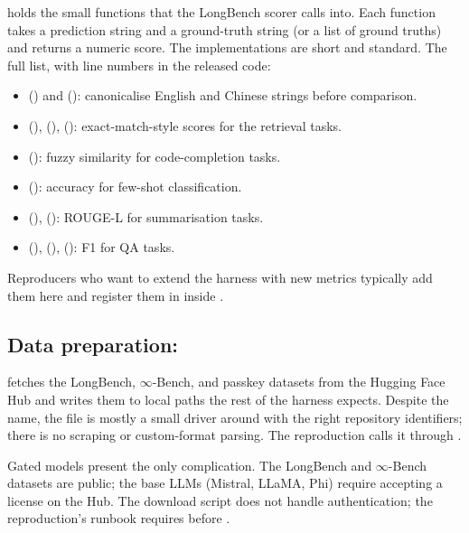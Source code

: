  holds the small functions that the LongBench scorer calls into. Each function takes a prediction string and a ground-truth string (or a list of ground truths) and returns a numeric score. The implementations are short and standard. The full list, with line numbers in the released code:
\begin{itemize}
  \item {} () and  (): canonicalise English and Chinese strings before comparison.
  \item {} (),  (),  (): exact-match-style scores for the retrieval tasks.
  \item {} (): fuzzy similarity for code-completion tasks.
  \item {} (): accuracy for few-shot classification.
  \item {} (),  (): ROUGE-L for summarisation tasks.
  \item {} (),  (),  (): F1 for QA tasks.
\end{itemize}
Reproducers who want to extend the harness with new metrics typically add them here and register them in  inside .

\subsection{Data preparation: }
\label{sec:bench-download}

 fetches the LongBench, $\infty$-Bench, and passkey datasets from the Hugging Face Hub and writes them to local paths the rest of the harness expects. Despite the name, the file is mostly a small driver around  with the right repository identifiers; there is no scraping or custom-format parsing. The reproduction calls it through .

Gated models present the only complication. The LongBench and $\infty$-Bench datasets are public; the base LLMs (Mistral, LLaMA, Phi) require accepting a license on the Hub. The download script does not handle authentication; the reproduction's runbook requires  before .

